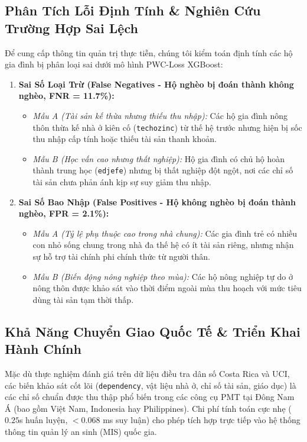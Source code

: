 \documentclass[conference]{IEEEtran}
\begin{document}
\subsection{Phân Tích Lỗi Định Tính & Nghiên Cứu Trường Hợp Sai Lệch}
Để cung cấp thông tin quản trị thực tiễn, chúng tôi kiểm toán định tính các hộ gia đình bị phân loại sai dưới mô hình PWC-Loss XGBoost:
\begin{enumerate}
\item \textbf{Sai Số Loại Trừ (False Negatives - Hộ nghèo bị đoán thành không nghèo, FNR = 11.7\%):}
  \begin{itemize}
  \item \textit{Mẫu A (Tài sản kế thừa nhưng thiếu thu nhập):} Các hộ gia đình nông thôn thừa kế nhà ở kiên cố (\texttt{techozinc}) từ thế hệ trước nhưng hiện bị sốc thu nhập cấp tính hoặc thiếu tài sản thanh khoản.
  \item \textit{Mẫu B (Học vấn cao nhưng thất nghiệp):} Hộ gia đình có chủ hộ hoàn thành trung học (\texttt{edjefe}) nhưng bị thất nghiệp đột ngột, nơi các chỉ số tài sản chưa phản ánh kịp sự suy giảm thu nhập.
  \end{itemize}
\item \textbf{Sai Số Bao Nhập (False Positives - Hộ không nghèo bị đoán thành nghèo, FPR = 2.1\%):}
  \begin{itemize}
  \item \textit{Mẫu A (Tỷ lệ phụ thuộc cao trong nhà chung):} Các gia đình trẻ có nhiều con nhỏ sống chung trong nhà đa thế hệ có ít tài sản riêng, nhưng nhận sự hỗ trợ tài chính phi chính thức từ người thân.
  \item \textit{Mẫu B (Biến động nông nghiệp theo mùa):} Các hộ nông nghiệp tự do ở nông thôn được khảo sát vào thời điểm ngoài mùa thu hoạch với mức tiêu dùng tài sản tạm thời thấp.
  \end{itemize}
\end{enumerate}

\subsection{Khả Năng Chuyển Giao Quốc Tế & Triển Khai Hành Chính}
Mặc dù thực nghiệm đánh giá trên dữ liệu điều tra dân số Costa Rica và UCI, các biến khảo sát cốt lõi (\texttt{dependency}, vật liệu nhà ở, chỉ số tài sản, giáo dục) là các chỉ số chuẩn được thu thập phổ biến trong các công cụ PMT tại Đông Nam Á (bao gồm Việt Nam, Indonesia hay Philippines). Chi phí tính toán cực nhẹ ($0.25$s huấn luyện, $<0.068$ ms suy luận) cho phép tích hợp trực tiếp vào hệ thống thông tin quản lý an sinh (MIS) quốc gia.
\end{document}
